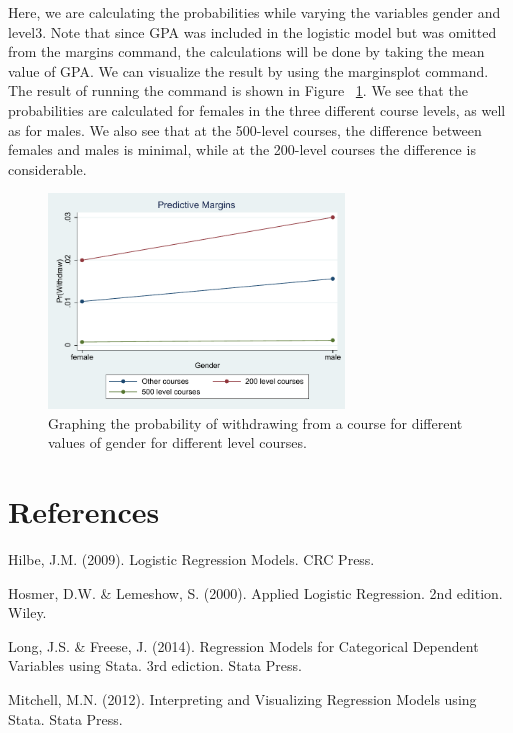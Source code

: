 \documentclass[a4paper,12pt,oneside]{book}
\begin{document}
Here, we are calculating the probabilities while varying the variables gender and level3. Note that since GPA was included in the logistic model but was omitted from the margins command, the calculations 
will be done by taking the mean value of GPA. We can visualize the result by using the marginsplot command. The result of running the command is shown in Figure ~\ref{fig:visual3}. We see that the probabilities 
are calculated for females in the three different course levels, as well as for males. We also see that at the 500-level courses, the difference between females and males is minimal, while at the 
200-level courses the difference is considerable.

\begin{stlog}\end{stlog}
\begin{figure}[h]
    \centering
    \includegraphics[width=0.7\textwidth]{book_67.pdf}
    \caption{Graphing the probability of withdrawing from a course for different values of gender for different level courses.}
    \label{fig:visual3}
\end{figure}

\chapter{References}
Hilbe, J.M. (2009). Logistic Regression Models. CRC Press.

Hosmer, D.W. \& Lemeshow, S. (2000). Applied Logistic Regression. 2nd edition. Wiley.

Long, J.S. \& Freese, J. (2014). Regression Models for Categorical Dependent Variables using Stata. 3rd ediction. Stata Press.

Mitchell, M.N. (2012). Interpreting and Visualizing Regression Models using Stata. Stata Press.
\end{document}
